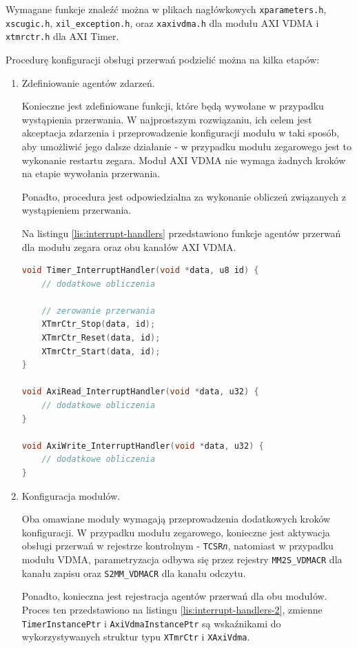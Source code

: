 Wymagane funkcje znaleźć można w plikach nagłówkowych \texttt{xparameters.h}, \texttt{xscugic.h}, \texttt{xil\_exception.h}, oraz \texttt{xaxivdma.h} dla modułu AXI VDMA i \texttt{xtmrctr.h} dla AXI Timer.

Procedurę konfiguracji obsługi przerwań podzielić można na kilka etapów:
\begin{enumerate}
	\item Zdefiniowanie agentów zdarzeń.
	
Konieczne jest zdefiniowane funkcji, które będą wywołane w przypadku wystąpienia przerwania. W najprostszym rozwiązaniu, ich celem jest akceptacja zdarzenia i przeprowadzenie konfiguracji modułu w taki sposób, aby umożliwić jego dalsze działanie - w przypadku modułu zegarowego jest to wykonanie restartu zegara. Moduł AXI VDMA nie wymaga żadnych kroków na etapie wywołania przerwania.

Ponadto, procedura jest odpowiedzialna za wykonanie obliczeń związanych z wystąpieniem przerwania.

Na listingu \ref{lis:interrupt-handlers} przedstawiono funkcje agentów przerwań dla modułu zegara oraz obu kanałów AXI VDMA.

\begin{lstlisting}[breaklines=true, language=C, caption=Procedury obsługi przerwań., label=lis:interrupt-handlers]
void Timer_InterruptHandler(void *data, u8 id) {
	// dodatkowe obliczenia
	
	// zerowanie przerwania
	XTmrCtr_Stop(data, id);
	XTmrCtr_Reset(data, id);
	XTmrCtr_Start(data, id);
}

void AxiRead_InterruptHandler(void *data, u32) {
	// dodatkowe obliczenia
}

void AxiWrite_InterruptHandler(void *data, u32) {
	// dodatkowe obliczenia
}
\end{lstlisting}

	\item Konfiguracja modułów.
	
Oba omawiane moduły wymagają przeprowadzenia dodatkowych kroków konfiguracji. W przypadku modułu zegarowego, konieczne jest aktywacja obsługi przerwań w rejestrze kontrolnym - \texttt{TCSR\textit{n}}, natomiast w przypadku modułu VDMA, parametryzacja odbywa się przez rejestry \texttt{MM2S\_VDMACR} dla kanału zapisu oraz \texttt{S2MM\_VDMACR} dla kanału odczytu.

Ponadto, konieczna jest rejestracja agentów przerwań dla obu modułów. Proces ten przedstawiono na listingu \ref{lis:interrupt-handlers-2}, zmienne \texttt{TimerInstancePtr} i \texttt{AxiVdmaInstancePtr} są wskaźnikami do wykorzystywanych struktur typu \texttt{XTmrCtr} i \texttt{XAxiVdma}.


\end{enumerate}
